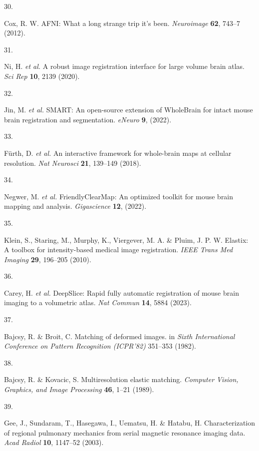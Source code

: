\documentclass[
  12pt,
]{article}
\newlength{\cslhangindent}
\newlength{\csllabelwidth}
\newenvironment{CSLReferences}[2] %
 {%
  \setlength{\parindent}{0pt}
  \ifodd #1 \everypar{\setlength{\hangindent}{\cslhangindent}}\ignorespaces\fi
  \ifnum #2 > 0
  \setlength{\parskip}{#2\baselineskip}
  \fi
 }%
 {}
\newcommand{\CSLLeftMargin}[1]{\parbox[t]{\csllabelwidth}{#1}}
\newcommand{\CSLRightInline}[1]{\parbox[t]{\linewidth - \csllabelwidth}{#1}\break}
\begin{document}
\begin{CSLReferences}{0}{0}
\leavevmode{}%
\CSLLeftMargin{30. }
\CSLRightInline{Cox, R. W. {AFNI}: What a long strange trip it's been.
\emph{Neuroimage} \textbf{62}, 743--7 (2012).}

\leavevmode{}%
\CSLLeftMargin{31. }
\CSLRightInline{Ni, H. \emph{et al.} A robust image registration
interface for large volume brain atlas. \emph{Sci Rep} \textbf{10}, 2139
(2020).}

\leavevmode{}%
\CSLLeftMargin{32. }
\CSLRightInline{Jin, M. \emph{et al.} SMART: An open-source extension of
WholeBrain for intact mouse brain registration and segmentation.
\emph{eNeuro} \textbf{9}, (2022).}

\leavevmode{}%
\CSLLeftMargin{33. }
\CSLRightInline{Fürth, D. \emph{et al.} An interactive framework for
whole-brain maps at cellular resolution. \emph{Nat Neurosci}
\textbf{21}, 139--149 (2018).}

\leavevmode{}%
\CSLLeftMargin{34. }
\CSLRightInline{Negwer, M. \emph{et al.} FriendlyClearMap: An optimized
toolkit for mouse brain mapping and analysis. \emph{Gigascience}
\textbf{12}, (2022).}

\leavevmode{}%
\CSLLeftMargin{35. }
\CSLRightInline{Klein, S., Staring, M., Murphy, K., Viergever, M. A. \&
Pluim, J. P. W. Elastix: A toolbox for intensity-based medical image
registration. \emph{IEEE Trans Med Imaging} \textbf{29}, 196--205
(2010).}

\leavevmode{}%
\CSLLeftMargin{36. }
\CSLRightInline{Carey, H. \emph{et al.} DeepSlice: Rapid fully automatic
registration of mouse brain imaging to a volumetric atlas. \emph{Nat
Commun} \textbf{14}, 5884 (2023).}

\leavevmode{}%
\CSLLeftMargin{37. }
\CSLRightInline{Bajcsy, R. \& Broit, C. Matching of deformed images. in
\emph{{S}ixth {I}nternational {C}onference on {P}attern {R}ecognition
({ICPR}'82)} 351--353 (1982).}

\leavevmode{}%
\CSLLeftMargin{38. }
\CSLRightInline{Bajcsy, R. \& Kovacic, S. Multiresolution elastic
matching. \emph{Computer Vision, Graphics, and Image Processing}
\textbf{46}, 1--21 (1989).}

\leavevmode{}%
\CSLLeftMargin{39. }
\CSLRightInline{Gee, J., Sundaram, T., Hasegawa, I., Uematsu, H. \&
Hatabu, H. Characterization of regional pulmonary mechanics from serial
magnetic resonance imaging data. \emph{Acad Radiol} \textbf{10},
1147--52 (2003).}


\end{CSLReferences}
\end{document}
